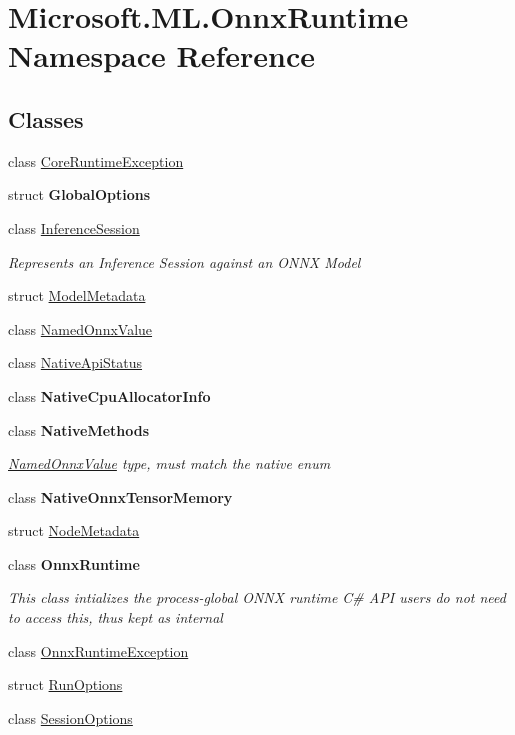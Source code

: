 \hypertarget{namespaceMicrosoft_1_1ML_1_1OnnxRuntime}{}\section{Microsoft.\+M\+L.\+Onnx\+Runtime Namespace Reference}
\label{namespaceMicrosoft_1_1ML_1_1OnnxRuntime}
\subsection*{Classes}
\begin{DoxyCompactItemize}
\item 
class \mbox{\hyperlink{classMicrosoft_1_1ML_1_1OnnxRuntime_1_1CoreRuntimeException}{Core\+Runtime\+Exception}}
\item 
struct {\bfseries Global\+Options}
\item 
class \mbox{\hyperlink{classMicrosoft_1_1ML_1_1OnnxRuntime_1_1InferenceSession}{Inference\+Session}}
\begin{DoxyCompactList}\small\item\em Represents an Inference Session against an O\+N\+NX Model \end{DoxyCompactList}\item 
struct \mbox{\hyperlink{structMicrosoft_1_1ML_1_1OnnxRuntime_1_1ModelMetadata}{Model\+Metadata}}
\item 
class \mbox{\hyperlink{classMicrosoft_1_1ML_1_1OnnxRuntime_1_1NamedOnnxValue}{Named\+Onnx\+Value}}
\item 
class \mbox{\hyperlink{classMicrosoft_1_1ML_1_1OnnxRuntime_1_1NativeApiStatus}{Native\+Api\+Status}}
\item 
class {\bfseries Native\+Cpu\+Allocator\+Info}
\item 
class {\bfseries Native\+Methods}
\begin{DoxyCompactList}\small\item\em \mbox{\hyperlink{classMicrosoft_1_1ML_1_1OnnxRuntime_1_1NamedOnnxValue}{Named\+Onnx\+Value}} type, must match the native enum \end{DoxyCompactList}\item 
class {\bfseries Native\+Onnx\+Tensor\+Memory}
\item 
struct \mbox{\hyperlink{structMicrosoft_1_1ML_1_1OnnxRuntime_1_1NodeMetadata}{Node\+Metadata}}
\item 
class {\bfseries Onnx\+Runtime}
\begin{DoxyCompactList}\small\item\em This class intializes the process-\/global O\+N\+NX runtime C\# A\+PI users do not need to access this, thus kept as internal \end{DoxyCompactList}\item 
class \mbox{\hyperlink{classMicrosoft_1_1ML_1_1OnnxRuntime_1_1OnnxRuntimeException}{Onnx\+Runtime\+Exception}}
\item 
struct \mbox{\hyperlink{structMicrosoft_1_1ML_1_1OnnxRuntime_1_1RunOptions}{Run\+Options}}
\item 
class \mbox{\hyperlink{classMicrosoft_1_1ML_1_1OnnxRuntime_1_1SessionOptions}{Session\+Options}}
\end{DoxyCompactItemize}
